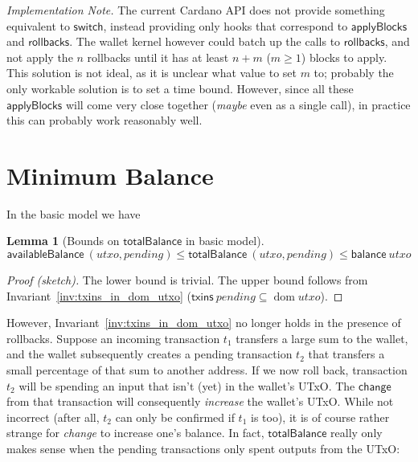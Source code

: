 \documentclass{article}
\DeclareMathOperator{\dom}{dom}
\newtheorem{lemma}{Lemma}[section] %
\numberwithin{equation}{lemma}
\begin{document}
\emph{Implementation Note.} The current Cardano API does not provide something
equivalent to $\mathsf{switch}$, instead providing only hooks that correspond to
$\mathsf{applyBlocks}$ and $\mathsf{rollbacks}$. The wallet kernel however could
batch up the calls to $\mathsf{rollbacks}$, and not apply the $n$ rollbacks
until it has at least $n + m$ ($m \ge 1$) blocks to apply. This solution is not
ideal, as it is unclear what value to set $m$ to; probably the only workable
solution is to set a time bound. However, since all these $\mathsf{applyBlocks}$
will come very close together (\emph{maybe} even as a single call), in practice
this can probably work reasonably well.


\section{Minimum Balance}
\label{sec:tracking_expected_UTxO}

In the basic model we have
%
\begin{lemma}[Bounds on $\mathsf{totalBalance}$ in basic model]
\begin{equation*}
    \mathsf{availableBalance} ~ (\mathit{utxo}, \mathit{pending})
\le \mathsf{totalBalance}     ~ (\mathit{utxo}, \mathit{pending})
\le \mathsf{balance} ~ \mathit{utxo}
\end{equation*}
\label{lem:bounds_in_basic_model}
\end{lemma}

\begin{proof}[Proof (sketch)]
The lower bound is trivial. The upper bound follows from
Invariant~\ref{inv:txins_in_dom_utxo} ($\mathsf{txins} ~ \mathit{pending}
\subseteq \dom \mathit{utxo}$).
\end{proof}

However, Invariant~\ref{inv:txins_in_dom_utxo} no longer holds in the presence
of rollbacks. Suppose an incoming transaction $t_1$ transfers a large sum to the
wallet, and the wallet subsequently creates a pending transaction $t_2$ that
transfers a small percentage of that sum to another address. If we now roll
back, transaction $t_2$ will be spending an input that isn't (yet) in the
wallet's UTxO. The $\mathsf{change}$ from that transaction will consequently
\emph{increase} the wallet's UTxO. While not incorrect (after all, $t_2$ can
only be confirmed if $t_1$ is too), it is of course rather strange for
\emph{change} to increase one's balance. In fact, $\mathsf{totalBalance}$
really only makes sense when the pending transactions only spent outputs from
the UTxO:
\end{document}
